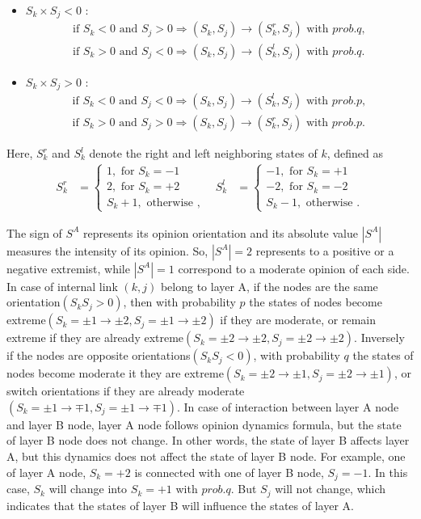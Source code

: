 \documentclass[english]{cccconf}
\begin{document}
\begin{itemize}
\item $S_k \times S_j < 0$ :
\begin{align*}
\mbox{if } S_k<0 \mbox{ and } S_j>0  \Rightarrow (S_k, S_j) \rightarrow (S_k^r, S_j) \mbox{ with } prob.q,\\
\mbox{if } S_k>0 \mbox{ and } S_j<0  \Rightarrow (S_k, S_j) \rightarrow (S_k^l, S_j) \mbox{ with } prob.q.
\end{align*}
\item $S_k \times S_j > 0$ :
\begin{align*}
\mbox{if } S_k<0 \mbox{ and } S_j<0  \Rightarrow (S_k, S_j) \rightarrow (S_k^l, S_j) \mbox{ with } prob.p,\\
\mbox{if } S_k>0 \mbox{ and } S_j>0  \Rightarrow (S_k, S_j) \rightarrow (S_k^r, S_j) \mbox{ with } prob.p.
\end{align*}
\end{itemize}
Here, $S_k^r$ and $S_k^l$ denote the right and left neighboring states of $k$, defined as
\begin{align*}
S_k^r &= \left\{\begin{matrix}
1,\mbox{ for } S_k = -1\\
2,\mbox{ for } S_k = +2\\ 
S_k + 1,\mbox{ otherwise }, 
\end{matrix}\right. &
S_k^l &= \left\{\begin{matrix}
-1,\mbox{ for } S_k= +1
\\ -2,\mbox{ for } S_k=-2
\\ S_k - 1,\mbox{ otherwise }.
\end{matrix}\right.
\end{align*}


The sign of $S^A$ represents its opinion orientation and its absolute value $|S^A|$ measures the intensity of its opinion. So, $|S^A|=2$ represents to a positive or a negative extremist, while  $|S^A|=1$ correspond to a moderate opinion of each side. In case of internal link $(k, j)$ belong to layer A, if the nodes are the same orientation$(S_kS_j>0)$, then with probability $p$ the states of nodes become extreme$(S_k=\pm1 \rightarrow \pm2, S_j= \pm1 \rightarrow \pm2)$ if they are moderate, or remain extreme if they are already extreme$(S_k=\pm2 \rightarrow \pm2, S_j= \pm2 \rightarrow \pm2)$. Inversely if the nodes are opposite orientations$(S_kS_j<0)$, with probability $q$ the states of nodes become moderate it they are extreme$(S_k=\pm2 \rightarrow \pm1, S_j= \pm2 \rightarrow \pm1)$, or switch orientations if they are already moderate$(S_k=\pm1 \rightarrow \mp1, S_j= \pm1 \rightarrow \mp1)$.  In case of interaction between layer A node and layer B node, layer A node follows opinion dynamics formula, but the state of layer B node does not change. In other words, the state of layer B affects layer A, but this dynamics does not affect the state of layer B node. For example, one of layer A node, $S_k = +2$ is connected with one of layer B node, $S_j = -1$. In this case, $S_k$ will change into $S_k = +1$ with $prob.q$. But $S_j$ will not change, which indicates that the states of layer B will influence the states of layer A.
\end{document}
